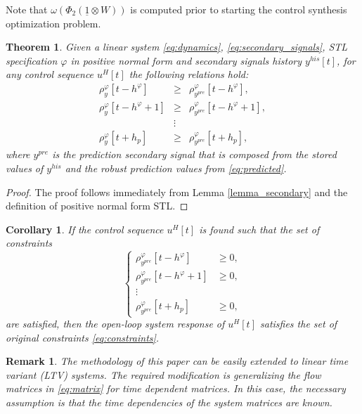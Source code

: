 \documentclass[letterpaper, 10 pt, conference]{ieeeconf}
\newtheorem{remark}{Remark}
\newtheorem{theorem}{Theorem}
\newtheorem{corollary}{Corollary}
\begin{document}
Note that $\omega\left(\Phi_2 (\underline{1}\otimes W)\right)$ is computed prior to starting the control synthesis optimization problem. 

\begin{theorem}
\label{theorem_robust}
Given a linear system \eqref{eq:dynamics}, \eqref{eq:secondary_signals}, STL specification $\varphi$ in positive normal form and secondary signals history $y^{his}[t]$, for any control sequence $u^H[t]$ the following relations hold:
\begin{equation}
\label{eq:robust_predict}
\begin{array}{lcl}
\rho_y^\varphi[t-h^\varphi] & \geq & \rho_{y^{pre}}^\varphi[t-h^\varphi], \\
\rho_y^\varphi[t-h^\varphi+1] & \geq & \rho_{y^{pre}}^\varphi[t-h^\varphi+1], \\
& \vdots & \\ 
\rho_y^\varphi[t+h_p] & \geq & \rho_{y^{pre}}^\varphi[t+h_p],
\end{array}
\end{equation}
where $y^{pre}$ is the prediction secondary signal that is composed from the stored values of $y^{his}$ and the robust prediction values from \eqref{eq:predicted}.
\end{theorem}
\begin{proof}
The proof follows immediately from Lemma \ref{lemma_secondary} and the definition of positive normal form STL. 
\end{proof}
\begin{corollary}
If the control sequence $u^H[t]$ is found such that the set of constraints
\begin{equation}
\label{eq:constraints_robust}
\left \{
\begin{array}{cc}
\rho_{y^{pre}}^\varphi[t-h^\varphi] & \geq 0, \\
\rho_{y^{pre}}^\varphi[t-h^\varphi+1] & \geq 0, \\
\vdots & \\ 
\rho_{y^{pre}}^\varphi[t+h_p] & \geq 0,
\end{array}
\right.
\end{equation}
are satisfied, then the open-loop system response of $u^H[t]$ satisfies the set of original constraints \eqref{eq:constraints}. 
\end{corollary}


\begin{remark}
The methodology of this paper can be easily extended to linear time variant (LTV) systems. The required modification is generalizing the flow matrices in \eqref{eq:matrix} for time dependent matrices. In this case, the necessary assumption is that the time dependencies of the system matrices are known. 
\end{remark}
\end{document}
